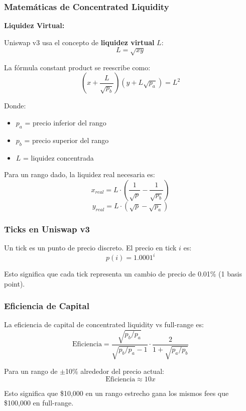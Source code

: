 \documentclass[11pt,a4paper,twoside]{book}
\begin{document}
\subsubsection{Matem\'aticas de Concentrated Liquidity}

\begin{mathnote}
\textbf{Liquidez Virtual:}

Uniswap v3 usa el concepto de \textbf{liquidez virtual} $L$:
\[
L = \sqrt{xy}
\]

La f\'ormula constant product se reescribe como:
\[
(x + \frac{L}{\sqrt{p_b}})(y + L\sqrt{p_a}) = L^2
\]

Donde:
\begin{itemize}
    \item $p_a$ = precio inferior del rango
    \item $p_b$ = precio superior del rango
    \item $L$ = liquidez concentrada
\end{itemize}

Para un rango dado, la liquidez real necesaria es:
\[
x_{real} = L \cdot (\frac{1}{\sqrt{p}} - \frac{1}{\sqrt{p_b}})
\]
\[
y_{real} = L \cdot (\sqrt{p} - \sqrt{p_a})
\]
\end{mathnote}

\subsubsection{Ticks en Uniswap v3}

\begin{definition}[Tick]
Un tick es un punto de precio discreto. El precio en tick $i$ es:
\[
p(i) = 1.0001^i
\]

Esto significa que cada tick representa un cambio de precio de 0.01\% (1 basis point).
\end{definition}

\subsubsection{Eficiencia de Capital}

\begin{keyidea}
La eficiencia de capital de concentrated liquidity vs full-range es:
\[
\text{Eficiencia} = \frac{\sqrt{p_b/p_a}}{\sqrt{p_b/p_a} - 1} \cdot \frac{2}{1 + \sqrt{p_a/p_b}}
\]

Para un rango de $\pm$10\% alrededor del precio actual:
\[
\text{Eficiencia} \approx 10x
\]

Esto significa que \$10,000 en un rango estrecho gana los mismos fees que \$100,000 en full-range.
\end{keyidea}
\end{document}
